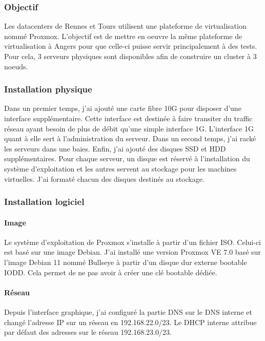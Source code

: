 \documentclass[12pt]{article}
\begin{document}
\subsubsection{Objectif}
Les datacenters de Rennes et Tours utilisent une plateforme de virtualisation nommé \gls{Proxmox}. 
L'objectif est de mettre en oeuvre la même plateforme de virtualisation à Angers pour que celle-ci puisse servir principalement à des tests. 
Pour cela, 3 serveurs physiques sont disponibles afin de construire un \gls{cluster} à 3 noeuds.

\subsubsection{Installation physique}
Dans un premier temps, j'ai ajouté une carte fibre 10G pour disposer d'une interface supplémentaire. 
Cette interface est destinée à faire transiter du traffic réseau ayant besoin de plus de débit qu'une simple interface 1G. 
L'interface 1G quant à elle sert à l'administration du serveur.
Dans un second temps, j'ai racké les serveurs dans une baies. 
Enfin, j'ai ajouté des disques \gls{SSD} et \gls{HDD} supplémentaires.
Pour chaque serveur, un disque est réservé à l'installation du système d'exploitation et les autres servent au stockage pour les machines virtuelles.
J'ai formaté chacun des disques destinés au stockage.

\subsubsection{Installation logiciel}
\paragraph{Image}
Le système d'exploitation de \gls{Proxmox} s'installe à partir d'un fichier \gls{ISO}. 
Celui-ci est basé sur une image \gls{Debian}. 
J'ai installé une version \gls{Proxmox} VE 7.0 basé sur l'image \gls{Debian} 11 nommé Bullseye à partir d'un disque dur externe bootable IODD. 
Cela permet de ne pas avoir à créer une clé bootable dédiée.

\paragraph{Réseau}
Depuis l'interface graphique, j'ai configuré la partie \gls{DNS} sur le \gls{DNS} interne et changé l'adresse \gls{IP} sur un réseau en 192.168.22.0/23. 
Le DHCP interne attribue par défaut des adresses sur le réseau 192.168.23.0/23.
\end{document}
